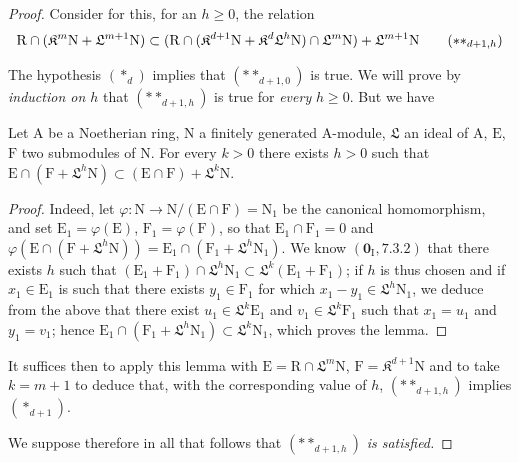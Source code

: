 \begin{proof}
Consider for this, for an $h\geqslant 0$, the relation
\begin{equation}
  \mathrm{R}\cap(\mathfrak K^m\mathrm{N}+\mathfrak{L}^{m+1}\mathrm{N})\subset(\mathrm{R}\cap(\mathfrak K^{d+1}\mathrm{N}+\mathfrak K^d\mathfrak{L}^h\mathrm{N})\cap\mathfrak{L}^m\mathrm{N})+\mathfrak{L}^{m+1}\mathrm{N}
  \tag{$**_{d+1,h}$}
\end{equation}

The hypothesis $(*_d)$ implies that $(**_{d+1,0})$ is true. We will prove by \emph{induction on $h$} that $(**_{d+1,h})$ is true for \emph{every} $h\geqslant 0$. But we have

\begin{lemma}[19.7.1.7]
\label{IV.19.7.1.7}
Let $\mathrm{A}$ be a Noetherian ring, $\mathrm{N}$ a finitely generated $\mathrm{A}$-module, $\mathfrak{L}$ an ideal of $\mathrm{A}$, $\mathrm{E}$, $\mathrm{F}$ two submodules of $\mathrm{N}$. For every $k>0$ there exists $h>0$ such that $\mathrm{E}\cap(\mathrm{F}+\mathfrak{L}^h\mathrm{N})\subset(\mathrm{E}\cap\mathrm{F})+\mathfrak{L}^k\mathrm{N}$.
\end{lemma}

\begin{proof}
Indeed, let $\varphi:\mathrm{N}\to\mathrm{N}/(\mathrm{E}\cap\mathrm{F})=\mathrm{N}_1$ be the canonical homomorphism, and set $\mathrm{E}_1=\varphi(\mathrm{E})$, $\mathrm{F}_1=\varphi(\mathrm{F})$, so that $\mathrm{E}_1\cap\mathrm{F}_1=0$ and $\varphi(\mathrm{E}\cap(\mathrm{F}+\mathfrak{L}^h\mathrm{N}))=\mathrm{E}_1\cap(\mathrm{F}_1+\mathfrak{L}^h\mathrm{N}_1)$.
We know $(\mathbf{0}_\mathrm{I},7.3.2)$ that there exists $h$ such that $(\mathrm{E}_1+\mathrm{F}_1)\cap\mathfrak{L}^h\mathrm{N}_1\subset\mathfrak{L}^k(\mathrm{E}_1+\mathrm{F}_1)$; if $h$ is thus chosen and if $x_1\in\mathrm{E}_1$ is such that there exists $y_1\in\mathrm{F}_1$ for which $x_1-y_1\in\mathfrak{L}^h\mathrm{N}_1$, we deduce from the above that there exist $u_1\in\mathfrak{L}^k\mathrm{E}_1$ and $v_1\in\mathfrak{L}^k\mathrm{F}_1$ such that $x_1=u_1$ and $y_1=v_1$; hence $\mathrm{E}_1\cap(\mathrm{F}_1+\mathfrak{L}^h\mathrm{N}_1)\subset\mathfrak{L}^k\mathrm{N}_1$, which proves the lemma.
\end{proof}

It suffices then to apply this lemma with $\mathrm{E}=\mathrm{R}\cap\mathfrak{L}^m\mathrm{N}$, $\mathrm{F}=\mathfrak{K}^{d+1}\mathrm{N}$ and to take $k=m+1$ to deduce that, with the corresponding value of $h$, $(**_{d+1,h})$ implies $(*_{d+1})$.

We suppose therefore in all that follows that $(**_{d+1,h})$ \emph{is satisfied.}


\end{proof}
